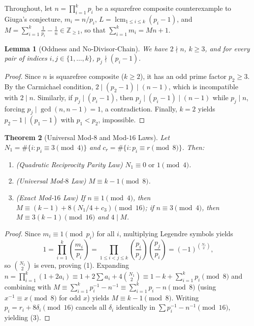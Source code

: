 \documentclass[11pt]{amsart}
\newtheorem{theorem}{Theorem}[section]
\newtheorem{lemma}[theorem]{Lemma}
\theoremstyle{definition}
\theoremstyle{remark}
\numberwithin{equation}{section}
\begin{document}
Throughout, let $n = \prod_{i=1}^k p_i$ be a squarefree composite counterexample to Giuga's conjecture, $m_i = n/p_i$, $L = \operatorname{lcm}_{1 \le i \le k}(p_i - 1)$, and $M = \sum_{i=1}^k \frac{1}{p_i} - \frac{1}{n} \in \mathbb{Z}_{\ge 1}$, so that $\sum_{i=1}^k m_i = M n + 1$.

\begin{lemma}[Oddness and No-Divisor-Chain]\label{lem:basic}
We have $2 \nmid n$, $k \ge 3$, and for every pair of indices $i, j \in \{1,\dots,k\}$, $p_j \nmid (p_i - 1)$.
\end{lemma}

\begin{proof}
Since $n$ is squarefree composite ($k \ge 2$), it has an odd prime factor $p_2 \ge 3$. By the Carmichael condition, $2 \mid (p_2 - 1) \mid (n - 1)$, which is incompatible with $2 \mid n$. Similarly, if $p_j \mid (p_i - 1)$, then $p_j \mid (p_i - 1) \mid (n - 1)$ while $p_j \mid n$, forcing $p_j \mid \gcd(n, n-1) = 1$, a contradiction. Finally, $k = 2$ yields $p_2 - 1 \mid (p_1 - 1)$ with $p_1 < p_2$, impossible.
\end{proof}

\begin{theorem}[Universal Mod-$8$ and Mod-$16$ Laws]\label{thm:mod8}
Let $N_1 = \#\{i : p_i \equiv 3 \pmod 4\}$ and $c_r = \#\{i : p_i \equiv r \pmod 8\}$. Then:
\begin{enumerate}
    \item \emph{(Quadratic Reciprocity Parity Law)} $N_1 \equiv 0 \text{ or } 1 \pmod 4$.
    \item \emph{(Universal Mod-$8$ Law)} $M \equiv k - 1 \pmod 8$.
    \item \emph{(Exact Mod-$16$ Law)} If $n \equiv 1 \pmod 4$, then $M \equiv (k - 1) + 8(N_1/4 + c_3) \pmod{16}$; if $n \equiv 3 \pmod 4$, then $M \equiv 3(k - 1) \pmod{16}$ and $4 \mid M$.
\end{enumerate}
\end{theorem}

\begin{proof}
Since $m_i \equiv 1 \pmod{p_i}$ for all $i$, multiplying Legendre symbols yields
\[
    1 = \prod_{i=1}^k \left(\frac{m_i}{p_i}\right) = \prod_{1 \le i < j \le k} \left(\frac{p_i}{p_j}\right)\left(\frac{p_j}{p_i}\right) = (-1)^{\binom{N_1}{2}},
\]
so $\binom{N_1}{2}$ is even, proving (1). Expanding $n = \prod_{i=1}^k (1 + 2a_i) \equiv 1 + 2\sum a_i + 4\binom{N_1}{2} \equiv 1 - k + \sum_{i=1}^k p_i \pmod 8$ and combining with $M \equiv \sum_{i=1}^k p_i^{-1} - n^{-1} \equiv \sum_{i=1}^k p_i - n \pmod 8$ (using $x^{-1} \equiv x \pmod 8$ for odd $x$) yields $M \equiv k - 1 \pmod 8$. Writing $p_i = r_i + 8\delta_i \pmod{16}$ cancels all $\delta_i$ identically in $\sum p_i^{-1} - n^{-1} \pmod{16}$, yielding (3).
\end{proof}
\end{document}

